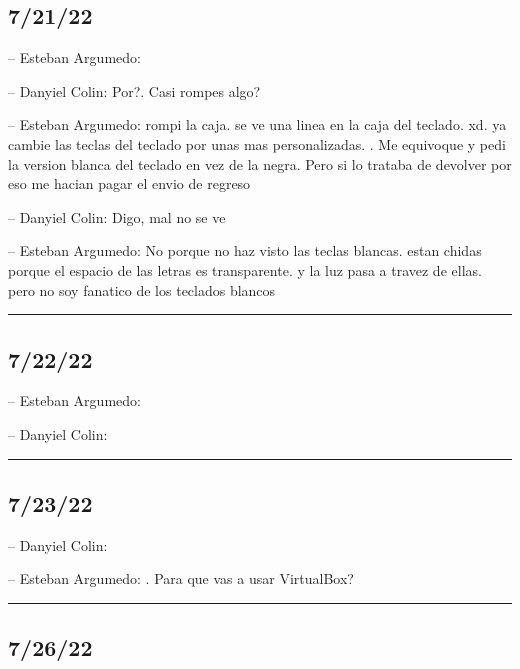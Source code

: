 \hypertarget{section-129}{%
\subsection{7/21/22}\label{section-129}}

-- Esteban Argumedo:

-- Danyiel Colin: Por?. Casi rompes algo?

-- Esteban Argumedo: rompi la caja. se ve una linea en la caja del
teclado. xd. ya cambie las teclas del teclado por unas mas
personalizadas. . Me equivoque y pedi la version blanca del teclado en
vez de la negra. Pero si lo trataba de devolver por eso me hacian pagar
el envio de regreso

-- Danyiel Colin: Digo, mal no se ve

-- Esteban Argumedo: No porque no haz visto las teclas blancas. estan
chidas porque el espacio de las letras es transparente. y la luz pasa a
travez de ellas. pero no soy fanatico de los teclados blancos

\begin{center}\rule{0.5\linewidth}{0.5pt}\end{center}

\hypertarget{section-130}{%
\subsection{7/22/22}\label{section-130}}

-- Esteban Argumedo:

-- Danyiel Colin:

\begin{center}\rule{0.5\linewidth}{0.5pt}\end{center}

\hypertarget{section-131}{%
\subsection{7/23/22}\label{section-131}}

-- Danyiel Colin:

-- Esteban Argumedo: . Para que vas a usar VirtualBox?

\begin{center}\rule{0.5\linewidth}{0.5pt}\end{center}

\hypertarget{section-132}{%
\subsection{7/26/22}\label{section-132}}

